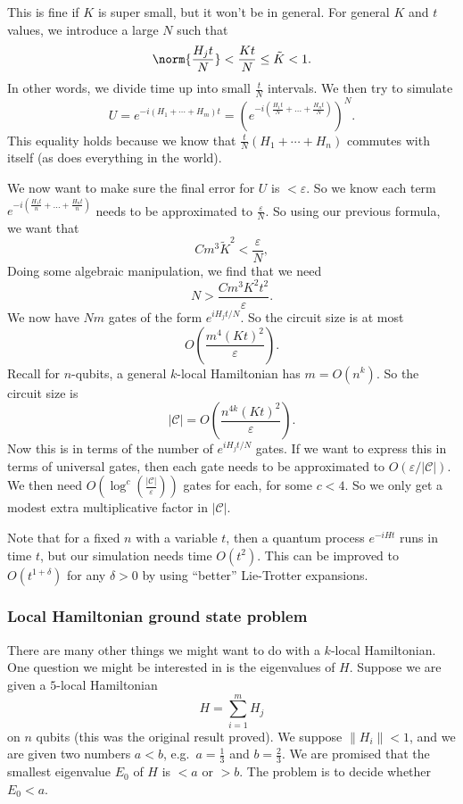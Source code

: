 \documentclass[a4paper]{article}
\begin{document}
This is fine if $K$ is super small, but it won't be in general. For general $K$ and $t$ values, we introduce a large $N$ such that
\[
  \norm{\frac{H_j t}{N}} < \frac{Kt}{N} \leq \tilde{K} < 1.
\]
In other words, we divide time up into small $\frac{t}{N}$ intervals. We then try to simulate
\[
  U = e^{-i (H_1 + \cdots + H_m)t } = \left(e^{-i \left(\frac{H_1 t}{N} + \ldots + \frac{H_n t}{N}\right)}\right)^N.
\]
This equality holds because we know that $\frac{t}{N}(H_1 + \cdots + H_n)$ commutes with itself (as does everything in the world).

We now want to make sure the final error for $U$ is $< \varepsilon$. So we know each term $e^{-i \left(\frac{H_1 t}{n} + \ldots + \frac{H_n t}{n}\right)}$ needs to be approximated to $\frac{\varepsilon}{N}$. So using our previous formula, we want that
\[
  Cm^3 \tilde{K}^2 < \frac{\varepsilon}{N},
\]
Doing some algebraic manipulation, we find that we need
\[
  N > \frac{Cm^3 K^2 t^2}{\varepsilon}.
\]
We now have $Nm$ gates of the form $e^{iH_j t/N}$. So the circuit size is at most
\[
  O\left(\frac{m^4(Kt)^2}{\varepsilon}\right).
\]
Recall for $n$-qubits, a general $k$-local Hamiltonian has $m = O(n^k)$. So the circuit size is
\[
  |\mathcal{C}| = O\left(\frac{n^{4k} (Kt)^2}{\varepsilon}\right).
\]
Now this is in terms of the number of $e^{iH_j t/N}$ gates. If we want to express this in terms of universal gates, then each gate needs to be approximated to $O(\varepsilon/|\mathcal{C}|)$. We then need $O(\log^c(\frac{|\mathcal{C}|}{\varepsilon}))$ gates for each, for some $c < 4$. So we only get a modest extra multiplicative factor in $|\mathcal{C}|$.

Note that for a fixed $n$ with a variable $t$, then a quantum process $e^{-iHt}$ runs in time $t$, but our simulation needs time $O(t^2)$. This can be improved to $O(t^{1 + \delta})$ for any $\delta > 0$ by using ``better'' Lie-Trotter expansions.

\subsubsection*{Local Hamiltonian ground state problem}
There are many other things we might want to do with a $k$-local Hamiltonian. One question we might be interested in is the eigenvalues of $H$. Suppose we are given a $5$-local Hamiltonian
\[
  H = \sum_{i = 1}^m H_j
\]
on $n$ qubits (this was the original result proved). We suppose $\|H_i\| < 1$, and we are given two numbers $a < b$, e.g.\ $a = \frac{1}{3}$ and $b = \frac{2}{3}$. We are promised that the smallest eigenvalue $E_0$ of $H$ is $ < a$ or $> b$. The problem is to decide whether $E_0 < a$.
\end{document}
